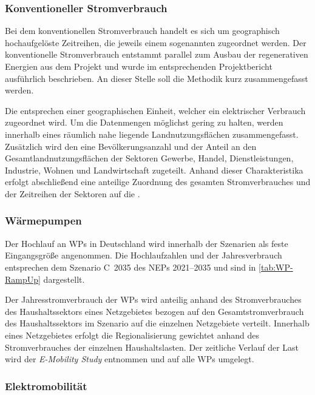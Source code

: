 \subsubsection{Konventioneller Stromverbrauch}

Bei dem konventionellen Stromverbrauch handelt es sich um geographisch hochaufgelöste Zeitreihen, die jeweils einem sogenannten \Lastgebiet zugeordnet werden.
Der konventionelle Stromverbrauch entstammt parallel zum Ausbau der regenerativen Energien aus dem  Projekt und wurde im entsprechenden Projektbericht \cite{Mueller2019} ausführlich beschrieben.
An dieser Stelle soll die Methodik kurz zusammengefasst werden.\medskip

Die \Lastgebiete entsprechen einer geographischen Einheit, welcher ein elektrischer Verbrauch zugeordnet wird.
Um die Datenmengen möglichst gering zu halten, werden innerhalb eines \Lastgebietes räumlich nahe liegende Landnutzungsflächen zusammengefasst.
Zusätzlich wird den \Lastgebieten eine Bevölkerungsanzahl und der Anteil an den Gesamtlandnutzungsflächen der Sektoren Gewerbe, Handel, Dienstleistungen, Industrie, Wohnen und Landwirtschaft zugeteilt.
Anhand dieser Charakteristika erfolgt abschließend eine anteilige Zuordnung des gesamten Stromverbrauches und der Zeitreihen der Sektoren auf die \Lastgebietedot.


\subsubsection{Wärmepumpen}

Der Hochlauf an \glspl{WP} in Deutschland wird innerhalb der Szenarien als feste Eingangsgröße angenommen.
Die Hochlaufzahlen und der Jahresverbrauch entsprechen dem Szenario C~\num{2035} des \glspl{NEP} \numrange[range-phrase=~{--}~]{2021}{2035} \cite{BNetzA2020} und sind in \autoref{tab:WP-RampUp} dargestellt.



Der Jahresstromverbrauch der \glspl{WP} wird anteilig anhand des Stromverbrauches des Haushaltssektors eines Netzgebietes bezogen auf den Gesamtstromverbrauch des Haushaltssektors im Szenario \ego auf die einzelnen Netzgebiete verteilt.
Innerhalb eines Netzgebietes erfolgt die Regionalisierung gewichtet anhand des Stromverbrauches der einzelnen Haushaltslasten.
Der zeitliche Verlauf der Last wird der \textit{E-Mobility Study} \cite{Schachler} entnommen und auf alle \glspl{WP} umgelegt.


\subsubsection{Elektromobilität}\label{chap:EMob_Szenarien}

